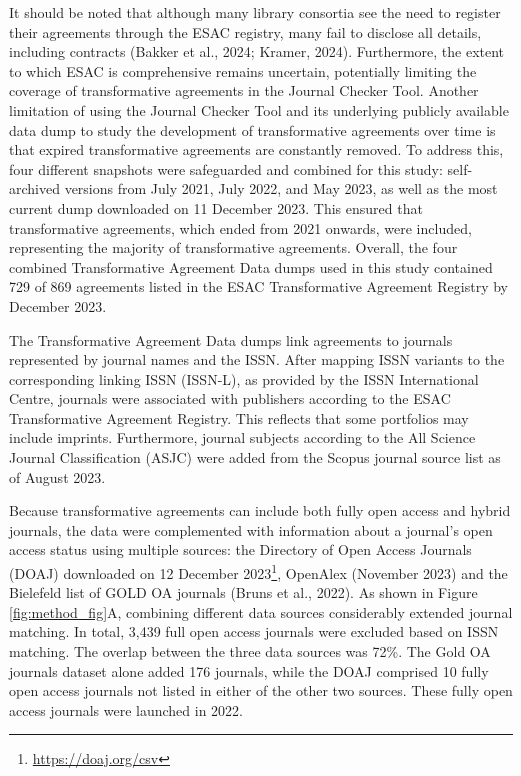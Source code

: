 \documentclass[a4paper,man,floatsintext,longtable,noextraspace,12pt]{apa6}
\begin{document}
It should be noted that although many library consortia see the need to
register their agreements through the ESAC registry, many fail to
disclose all details, including contracts (Bakker et al., 2024; Kramer,
2024). Furthermore, the extent to which ESAC is comprehensive remains
uncertain, potentially limiting the coverage of transformative
agreements in the Journal Checker Tool. Another limitation of using the
Journal Checker Tool and its underlying publicly available data dump to
study the development of transformative agreements over time is that
expired transformative agreements are constantly removed. To address
this, four different snapshots were safeguarded and combined for this
study: self-archived versions from July 2021, July 2022, and May 2023,
as well as the most current dump downloaded on 11 December 2023. This
ensured that transformative agreements, which ended from 2021 onwards,
were included, representing the majority of transformative agreements.
Overall, the four combined Transformative Agreement Data dumps used in
this study contained 729 of 869 agreements listed in the ESAC
Transformative Agreement Registry by December 2023.

The Transformative Agreement Data dumps link agreements to journals
represented by journal names and the ISSN. After mapping ISSN variants
to the corresponding linking ISSN (ISSN-L), as provided by the ISSN
International Centre, journals were associated with publishers according
to the ESAC Transformative Agreement Registry. This reflects that some
portfolios may include imprints. Furthermore, journal subjects according
to the All Science Journal Classification (ASJC) were added from the
Scopus journal source list as of August 2023.

Because transformative agreements can include both fully open access and
hybrid journals, the data were complemented with information about a
journal's open access status using multiple sources: the Directory of
Open Access Journals (DOAJ) downloaded on 12 December 2023\footnote{\url{https://doaj.org/csv}},
OpenAlex (November 2023) and the Bielefeld list of GOLD OA journals
(Bruns et al., 2022). As shown in Figure \ref{fig:method_fig}A,
combining different data sources considerably extended journal matching.
In total, 3,439 full open access journals were excluded based on ISSN
matching. The overlap between the three data sources was 72\%. The Gold
OA journals dataset alone added 176 journals, while the DOAJ comprised
10 fully open access journals not listed in either of the other two
sources. These fully open access journals were launched in 2022.
\end{document}
